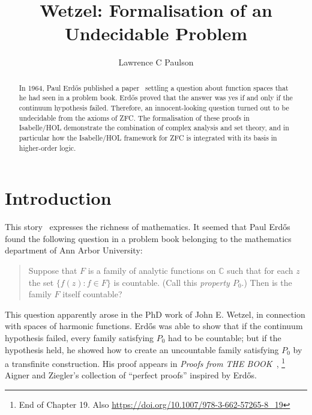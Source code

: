 \documentclass[runningheads]{llncs}
\begin{document}
%
\title{Wetzel: Formalisation of an Undecidable Problem}
%
%
\author{Lawrence C Paulson}
%
%
%
\maketitle              %
%
\begin{abstract}
In 1964, Paul Erd\H{o}s published a paper~\cite{erdos-interpolation} settling a question about function spaces that he had seen in a problem book.
Erd\H{o}s proved that the answer was yes if and only if the continuum hypothesis failed.
Therefore, an innocent-looking question turned out to be undecidable from the axioms of ZFC\@.
The formalisation of these proofs in Isabelle/HOL demonstrate the combination of complex analysis and set theory, and in particular how the Isabelle/HOL framework for ZFC is integrated with its basis in higher-order logic.
\end{abstract}


\section{Introduction}

This story~\cite{garcia-wetzels-problem} expresses the richness of mathematics.
It seemed that Paul Erd\H{o}s found the following question in a problem book belonging to the mathematics department of Ann Arbor University:
\begin{quote}
Suppose that $F$ is a family of analytic functions on $\mathbb{C}$ such that for each $z$ the set $\{f (z): f\in F\}$ is countable. (Call this \emph{property $P_0$}.) Then is the family $F$ itself countable?
\end{quote}
This question apparently arose in the PhD work of John E. Wetzel, in connection with spaces of harmonic functions.
Erd\H{o}s was able to show that if the continuum hypothesis failed, every family satisfying $P_0$ had to be countable; but if the hypothesis held, he showed how to create an uncountable family satisfying $P_0$ by a transfinite construction.
His proof appears in \textit{Proofs from THE BOOK}~\cite{aigner-proofs},%
\footnote{End of Chapter 19. Also  \url{https://doi.org/10.1007/978-3-662-57265-8_19}}
Aigner and Ziegler's collection of ``perfect proofs'' inspired by  Erd\H{o}s.
\end{document}
